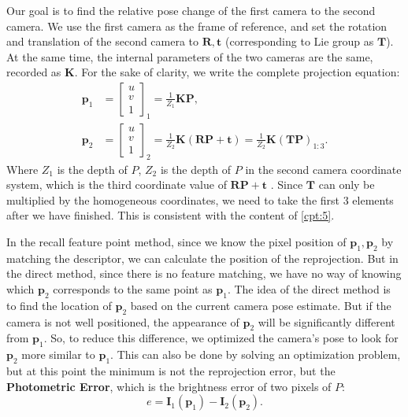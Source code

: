 Our goal is to find the relative pose change of the first camera to the second camera. We use the first camera as the frame of reference, and set the rotation and translation of the second camera to $\bm{R}, \bm{t}$ (corresponding to Lie group as $\bm{T}$). At the same time, the internal parameters of the two cameras are the same, recorded as $\bm{K}$. For the sake of clarity, we write the complete projection equation:
\begin{align*}
{\bm{p}_1} &= {\left[ \begin{array}{l}
u\\
v\\
	1
\end{array} \right]_1} = \frac{1}{Z_1} \bm{KP}, \\
{\bm{p}_2} &= {\left[ \begin{array}{l}
u\\
v\\
	1
\end{array} \right]_2} = \frac{1}{Z_2} \bm{K}\left( {\bm{RP} +\bm{t}} \right) = \frac{1}{ Z_2} \bm{K} \left(\bm{T} \bm{P} \right)_{1:3}.
\end{align*}
Where $Z_1$ is the depth of $P$, $Z_2$ is the depth of $P$ in the second camera coordinate system, which is the third coordinate value of $\bm{RP}+\bm{t}$ . Since $\bm{T}$ can only be multiplied by the homogeneous coordinates, we need to take the first 3 elements after we have finished. This is consistent with the content of \ref{cpt:5}.

In the recall feature point method, since we know the pixel position of $\bm{p}_1, \bm{p}_2$ by matching the descriptor, we can calculate the position of the reprojection. But in the direct method, since there is no feature matching, we have no way of knowing which $\bm{p}_2$ corresponds to the same point as $\bm{p}_1$. The idea of ​​the direct method is to find the location of $\bm{p}_2$ based on the current camera pose estimate. But if the camera is not well positioned, the appearance of $\bm{p}_2$ will be significantly different from $\bm{p}_1$. So, to reduce this difference, we optimized the camera's pose to look for $\bm{p}_2$ more similar to $\bm{p}_1$. This can also be done by solving an optimization problem, but at this point the minimum is not the reprojection error, but the \textbf{Photometric Error}, which is the brightness error of two pixels of $P$:
\begin{equation}
e = {\bm{I}_1}\left( {{\bm{p}_1}} \right) - {\bm{I}_2}\left( {{\bm{p}_2}} \right ).
\end{equation}

